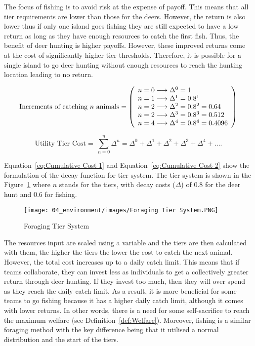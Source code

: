 The focus of fishing is to avoid risk at the expense of payoff. This means that all tier requirements are lower than those for the deers. However, the return is also lower thus if only one island goes fishing they are still expected to have a low return as long as they have enough resources to catch the first fish. Thus, the benefit of deer hunting is higher payoffs. However, these improved returns come at the cost of significantly higher tier thresholds. Therefore, it is possible for a single island to go deer hunting without enough resources to reach the hunting location leading to no return.

\begin{equation}
\text{Increments of catching $n$ animals}=
\left( \begin{array}{ll@{}}
n=0 \longrightarrow \Delta^0 = 1 \\
n=1 \longrightarrow \Delta^1 = 0.8^1 \\
n=2 \longrightarrow \Delta^2 = 0.8^2 = 0.64 \\
n=2 \longrightarrow \Delta^3 = 0.8^3 = 0.512 \\
n=4 \longrightarrow \Delta^4 = 0.8^4 = 0.4096\\
\end{array} \right) 
\label{eq:Cumulative Cost 1}
\end{equation}

\begin{equation}
\text{Utility Tier Cost}=\ \sum_{n=0}^{n} \Delta^{n} = \Delta^{0} + \Delta^{1} + \Delta^{2} + \Delta^{3} + \Delta^{4} + ....
\label{eq:Cumulative Cost 2}
\end{equation}

Equation~\eqref{eq:Cumulative Cost 1} and Equation~\eqref{eq:Cumulative Cost 2} show the formulation of the decay function for tier system. The tier system is shown in the Figure~\ref{fig:Foraging Tier System} where $n$ stands for the tiers, with decay costs ($\Delta$) of $0.8$ for the deer hunt and $0.6$ for fishing.

\begin{figure}[!htb]
    \centering
    \texttt{[image: 04\_environment/images/Foraging Tier System.PNG]}
    \caption{Foraging Tier System}
    \label{fig:Foraging Tier System}
\end{figure}

The resources input are scaled using a variable and the tiers are then calculated with them, the higher the tiers the lower the cost to catch the next animal. However, the total cost increases up to a daily catch limit. This means that if teams collaborate, they can invest less as individuals to get a collectively greater return through deer hunting. If they invest too much, then they will over spend as they reach the daily catch limit. As a result, it is more beneficial for some teams to go fishing because it has a higher daily catch limit, although it comes with lower returns. In other words, there is a need for some self-sacrifice to reach the maximum welfare (see Definition~\ref{def:Welfare}). Moreover, fishing is a similar foraging method with the key difference being that it utilised a normal distribution and the start of the tiers.


